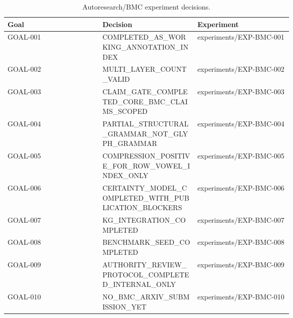 \begin{table}[t]
\caption{Autoresearch/BMC experiment decisions.}
\label{tab:autoresearch-decisions}
\small
\begin{tabular}{|p{0.22\linewidth}|p{0.22\linewidth}|p{0.22\linewidth}|}
\hline
Goal & Decision & Experiment \\
\hline
GOAL-001 & COMPLETED\_AS\_WORKING\_ANNOTATION\_INDEX & experiments/EXP-BMC-001 \\
GOAL-002 & MULTI\_LAYER\_COUNT\_VALID & experiments/EXP-BMC-002 \\
GOAL-003 & CLAIM\_GATE\_COMPLETED\_CORE\_BMC\_CLAIMS\_SCOPED & experiments/EXP-BMC-003 \\
GOAL-004 & PARTIAL\_STRUCTURAL\_GRAMMAR\_NOT\_GLYPH\_GRAMMAR & experiments/EXP-BMC-004 \\
GOAL-005 & COMPRESSION\_POSITIVE\_FOR\_ROW\_VOWEL\_INDEX\_ONLY & experiments/EXP-BMC-005 \\
GOAL-006 & CERTAINTY\_MODEL\_COMPLETED\_WITH\_PUBLICATION\_BLOCKERS & experiments/EXP-BMC-006 \\
GOAL-007 & KG\_INTEGRATION\_COMPLETED & experiments/EXP-BMC-007 \\
GOAL-008 & BENCHMARK\_SEED\_COMPLETED & experiments/EXP-BMC-008 \\
GOAL-009 & AUTHORITY\_REVIEW\_PROTOCOL\_COMPLETED\_INTERNAL\_ONLY & experiments/EXP-BMC-009 \\
GOAL-010 & NO\_BMC\_ARXIV\_SUBMISSION\_YET & experiments/EXP-BMC-010 \\
\hline
\end{tabular}
\end{table}
